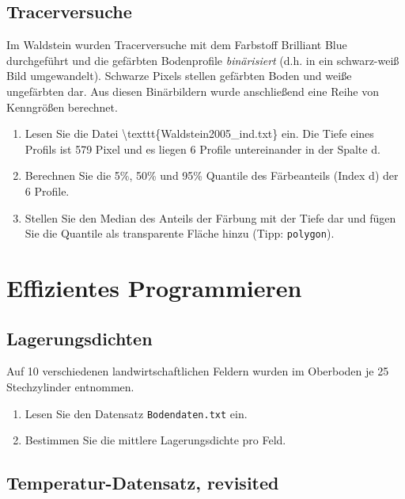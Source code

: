\documentclass[]{book}
\providecommand{\tightlist}{%
  \setlength{\itemsep}{0pt}\setlength{\parskip}{0pt}}
\begin{document}
\hypertarget{tracerversuche}{%
\subsection{Tracerversuche}\label{tracerversuche}}

Im Waldstein wurden Tracerversuche mit dem Farbstoff Brilliant Blue durchgeführt und die gefärbten Bodenprofile \emph{binärisiert} (d.h. in ein schwarz-weiß Bild umgewandelt). Schwarze Pixels stellen gefärbten Boden und weiße ungefärbten dar. Aus diesen Binärbildern wurde anschließend eine Reihe von Kenngrößen berechnet.

\begin{enumerate}
\def\labelenumi{\arabic{enumi}.}
\tightlist
\item
  Lesen Sie die Datei \textbackslash{}texttt\{Waldstein2005\_ind.txt\} ein. Die Tiefe eines Profils ist 579 Pixel und es liegen 6 Profile untereinander in der Spalte d.
\item
  Berechnen Sie die 5\%, 50\% und 95\% Quantile des Färbeanteils (Index d) der 6 Profile.
\item
  Stellen Sie den Median des Anteils der Färbung mit der Tiefe dar und fügen Sie die Quantile als transparente Fläche hinzu (Tipp: \texttt{polygon}).
\end{enumerate}

\hypertarget{effizientes-programmieren}{%
\section{Effizientes Programmieren}\label{effizientes-programmieren}}

\hypertarget{lagerungsdichten}{%
\subsection{Lagerungsdichten}\label{lagerungsdichten}}

Auf 10 verschiedenen landwirtschaftlichen Feldern wurden im Oberboden je 25 Stechzylinder entnommen.

\begin{enumerate}
\def\labelenumi{\arabic{enumi}.}
\tightlist
\item
  Lesen Sie den Datensatz \texttt{Bodendaten.txt} ein.
\item
  Bestimmen Sie die mittlere Lagerungsdichte pro Feld.
\end{enumerate}

\hypertarget{temperatur-datensatz-revisited}{%
\subsection{Temperatur-Datensatz, revisited}\label{temperatur-datensatz-revisited}}
\end{document}
